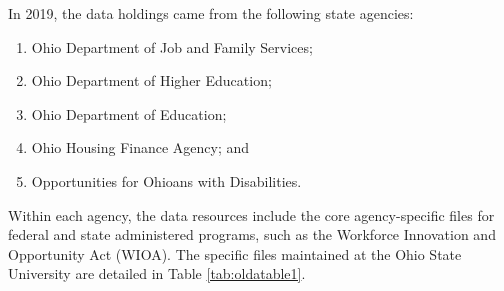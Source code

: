 \documentclass[
]{book}
\providecommand{\tightlist}{%
  \setlength{\itemsep}{0pt}\setlength{\parskip}{0pt}}
\begin{document}
In 2019, the data holdings came from the following state agencies:

\begin{enumerate}
\def\labelenumi{\arabic{enumi}.}
\tightlist
\item
  Ohio Department of Job and Family Services;
\item
  Ohio Department of Higher Education;
\item
  Ohio Department of Education;
\item
  Ohio Housing Finance Agency; and
\item
  Opportunities for Ohioans with Disabilities.
\end{enumerate}

Within each agency, the data resources include the core agency-specific files for federal and state administered programs, such as the Workforce Innovation and Opportunity Act (WIOA). The specific files maintained at the Ohio State University are detailed in Table \ref{tab:oldatable1}.
\end{document}
